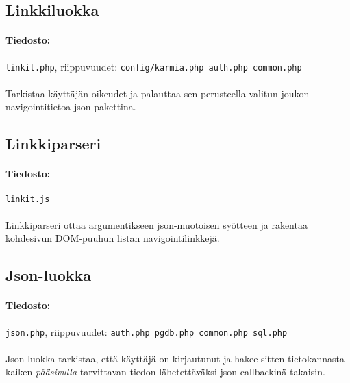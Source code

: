 \documentclass[11pt]{article}
\begin{document}

\subsection{Linkkiluokka}

\paragraph{Tiedosto:} \large{\texttt{linkit.php}}, riippuvuudet: \texttt{config/karmia.php auth.php common.php}

\paragraph{} Tarkistaa käyttäjän oikeudet ja palauttaa sen perusteella valitun joukon navigointitietoa json-pakettina.


\subsection{Linkkiparseri}

\paragraph{Tiedosto:} \large{\texttt{linkit.js}}

\paragraph{} Linkkiparseri ottaa argumentikseen json-muotoisen syötteen ja rakentaa kohdesivun DOM-puuhun listan navigointilinkkejä.


\subsection{Json-luokka}

\paragraph{Tiedosto:} \large{\texttt{json.php}}, riippuvuudet: \texttt{auth.php pgdb.php common.php sql.php}

\paragraph{} Json-luokka tarkistaa, että käyttäjä on kirjautunut ja hakee sitten tietokannasta kaiken \emph{pääsivulla} tarvittavan tiedon lähetettäväksi json-callbackinä takaisin.
\end{document}
